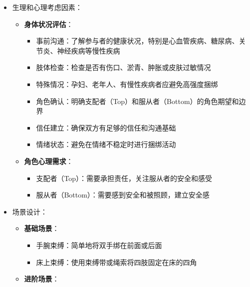 \documentclass[12pt,UTF8]{ctexbook}
\begin{document}
\begin{itemize}
\begin{itemize}
\begin{itemize}
      \item 学习正确的捆绑技术，特别是日本绳缚（Shibari）的安全要点
      \item 确保有快速解除捆绑的工具（如专门的安全剪刀，放在容易拿到的地方）
      \item 建立安全词或安全信号，确保参与者可以随时停止
      \end{itemize}
    \item 生理和心理考虑因素：
      \begin{itemize}
      \item \textbf{身体状况评估}：
        \begin{itemize}
        \item 事前沟通：了解参与者的健康状况，特别是心血管疾病、糖尿病、关节炎、神经疾病等慢性疾病
        \item 肢体检查：检查是否有伤口、淤青、肿胀或皮肤过敏情况
        \item 特殊情况：孕妇、老年人、有慢性疾病者应避免高强度捆绑
        \end{itemize}
        \begin{itemize}
        \item 角色确认：明确支配者（Top）和服从者（Bottom）的角色期望和边界
        \item 信任建立：确保双方有足够的信任和沟通基础
        \item 情绪状态：避免在情绪不稳定时进行捆绑活动
        \end{itemize}
      \item \textbf{角色心理需求}：
        \begin{itemize}
        \item 支配者（Top）：需要承担责任，关注服从者的安全和感受
        \item 服从者（Bottom）：需要感到安全和被照顾，建立安全感
        \end{itemize}
      \end{itemize}
    \item 场景设计：
      \begin{itemize}
      \item \textbf{基础场景}：
        \begin{itemize}
        \item 手腕束缚：简单地将双手绑在前面或后面
        \item 床上束缚：使用束缚带或绳索将四肢固定在床的四角
        \end{itemize}
      \item \textbf{进阶场景}：
        \begin{itemize}

\end{itemize}
\end{itemize}
\end{itemize}
\end{itemize}
\end{document}
